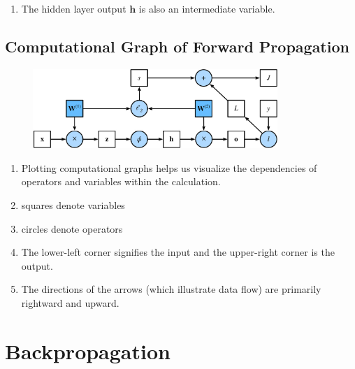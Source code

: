 \begin{enumerate}
    \item The hidden layer output $\mathbf{h}$ is also an intermediate variable.
\end{enumerate}

\subsection{Computational Graph of Forward Propagation \cite{dnn-1}}

\begin{figure}[H]
    \centering
    \includegraphics[width=\linewidth, height=3cm, keepaspectratio]{Pictures/deep_neural_networks/Computational Graph of Forward Propagation-5.3.1.jpg}
\end{figure}

\begin{enumerate}
    \item Plotting computational graphs helps us visualize the dependencies of operators and variables within the calculation.

    \item squares denote variables
    \item circles denote operators 
    
    \item The lower-left corner signifies the input and the upper-right corner is the output. 
    
    \item The directions of the arrows (which illustrate data flow) are primarily rightward and upward.

\end{enumerate}




\section{Backpropagation \cite{dnn-1}} \label{Backpropagation}


